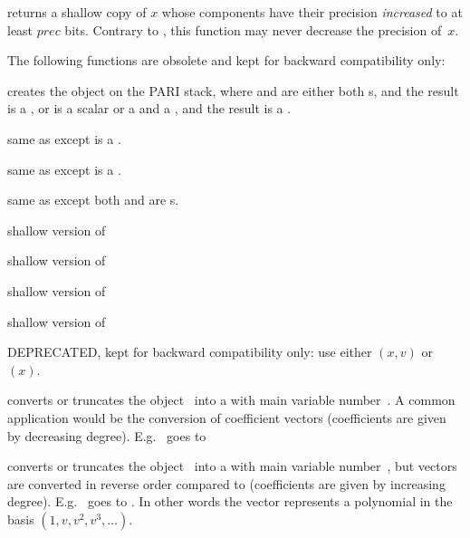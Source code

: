  returns a shallow copy of $x$ whose
 components have their precision \emph{increased} to at least $prec$
bits. Contrary to , this function may never decrease
the precision of~$x$.

The following functions are obsolete and kept for backward compatibility only:




 creates the object  on
the PARI stack, where  and  are either both s, and the
result is a , or  is a scalar or a  and  a
, and the result is a .

 same as  except  is a
.

 same as  except  is a
.

 same as  except both
 and  are s.

 shallow version of 

 shallow version of 

 shallow version of 

 shallow version of 

 DEPRECATED, kept for backward
compatibility only: use either $(x,v)$ or $(x)$.


 converts or truncates the object~
into a  with main variable number~. A common application
would be the conversion of coefficient vectors (coefficients are given by
decreasing degree). E.g.~\kbd{[2,3]} goes to 

 converts or truncates the object~
into a  with main variable number~, but vectors are converted
in reverse order compared to  (coefficients are given by
increasing degree). E.g.~\kbd{[2,3]} goes to . In other words
the vector represents a polynomial in the basis $(1,v,v^2,v^3,\dots)$.

